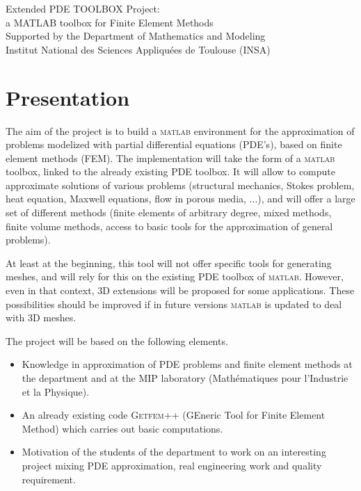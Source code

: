 \documentclass[11pt,a4paper]{article}
\begin{document}
\begin{center}
{\LARGE Extended PDE TOOLBOX Project: \\[0.2cm]
a MATLAB toolbox for Finite Element Methods} \\[0.2cm]
{\large Supported by the Department of Mathematics and Modeling \\[0.2cm]
Institut National des Sciences Appliqu\'ees de Toulouse (INSA) }\\[1.5cm]
\end{center}

\section{Presentation}

The aim of the project is to build a \textsc{matlab} environment for the
approximation of problems modelized with partial differential equations
(PDE's), based on finite element methods (FEM). The implementation will 
take the form of a \textsc{matlab} toolbox, linked to the already existing 
PDE toolbox. It will allow to compute approximate solutions of
various problems (structural mechanics, Stokes problem, heat equation,
Maxwell equations, flow in porous media, ...), and will offer a large set of
different methods (finite elements of arbitrary degree, mixed methods,
finite volume methods, access to basic tools for the approximation of
general problems).

At least at the beginning, this tool will not offer specific tools for
generating meshes, and will rely for this on the existing PDE toolbox of 
\textsc{matlab}. However, even in that context, 3D extensions will be
proposed for some applications. These possibilities should be improved if in
future versions \textsc{matlab} is updated to deal with 3D meshes. 

The project will be based on the following elements.
\begin{itemize}
\item  Knowledge in approximation of PDE problems and finite element methods
at the department and at the MIP laboratory (Math\'{e}matiques pour
l'Industrie et la Physique).

\item  An already existing code \textsc{Getfem++}  (GEneric Tool for Finite
Element Method) which carries out basic computations.

\item  Motivation of the students of the department to work on an
interesting project mixing PDE approximation, real engineering work and
quality requirement.
\end{itemize}
\end{document}
